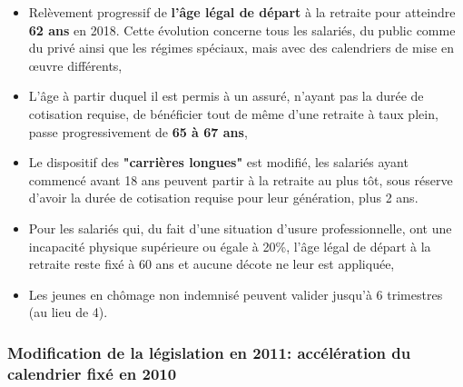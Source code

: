 \begin{itemize}
	\item  Relèvement progressif de \textbf{l'âge légal de départ} à 
la retraite pour atteindre \textbf{62 ans} en 2018. Cette évolution 
concerne tous les salariés, du public comme du privé ainsi 
que les régimes spéciaux, mais avec des calendriers de mise 
en œuvre différents,
	\item   L'âge à partir duquel il est permis à un assuré, 
n'ayant pas la durée de cotisation requise, de bénéficier 
tout de même d'une retraite à taux plein, passe 
progressivement de \textbf{65 à 67 ans},
	\item   Le dispositif des \textbf{"carrières longues"} est modifié, 
les salariés ayant commencé avant 18 ans peuvent partir à la 
retraite au plus tôt, sous réserve d'avoir la durée de 
cotisation requise pour leur génération, plus 2 ans.
	\item   Pour les salariés qui, du fait d'une situation 
d'usure professionnelle, ont une incapacité physique 
supérieure ou égale à 20\%, l'âge légal de départ à la 
retraite reste fixé à 60 ans et aucune décote ne leur est 
appliquée,
	\item   Les jeunes en chômage non indemnisé peuvent 
valider jusqu'à 6 trimestres (au lieu de 4).
\end{itemize}

\subsubsection{Modification de la législation en 2011: accélération du calendrier fixé en 2010}

